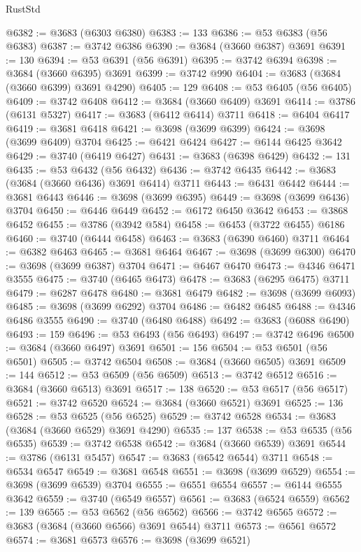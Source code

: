 \begin{lexlean}{RustStd}
\begin{coremodule}
@6382 := @3683 (@6303 @6380)
@6383 := 133
@6386 := @53 @6383 (@56 @6383)
@6387 := @3742 @6386
@6390 := @3684 (@3660 @6387) @3691
@6391 := 130
@6394 := @53 @6391 (@56 @6391)
@6395 := @3742 @6394
@6398 := @3684 (@3660 @6395) @3691
@6399 := @3742 @990
@6404 := @3683 (@3684 (@3660 @6399) @3691 @4290)
@6405 := 129
@6408 := @53 @6405 (@56 @6405)
@6409 := @3742 @6408
@6412 := @3684 (@3660 @6409) @3691
@6414 := @3786 (@6131 @5327)
@6417 := @3683 (@6412 @6414) @3711
@6418 := @6404 @6417
@6419 := @3681 @6418
@6421 := @3698 (@3699 @6399)
@6424 := @3698 (@3699 @6409) @3704
@6425 := @6421 @6424
@6427 := @6144 @6425 @3642
@6429 := @3740 (@6419 @6427)
@6431 := @3683 (@6398 @6429)
@6432 := 131
@6435 := @53 @6432 (@56 @6432)
@6436 := @3742 @6435
@6442 := @3683 (@3684 (@3660 @6436) @3691 @6414) @3711
@6443 := @6431 @6442
@6444 := @3681 @6443
@6446 := @3698 (@3699 @6395)
@6449 := @3698 (@3699 @6436) @3704
@6450 := @6446 @6449
@6452 := @6172 @6450 @3642
@6453 := @3868 @6452
@6455 := @3786 (@3942 @584)
@6458 := @6453 (@3722 @6455) @6186
@6460 := @3740 (@6444 @6458)
@6463 := @3683 (@6390 @6460) @3711
@6464 := @6382 @6463
@6465 := @3681 @6464
@6467 := @3698 (@3699 @6300)
@6470 := @3698 (@3699 @6387) @3704
@6471 := @6467 @6470
@6473 := @4346 @6471 @3555
@6475 := @3740 (@6465 @6473)
@6478 := @3683 (@6295 @6475) @3711
@6479 := @6287 @6478
@6480 := @3681 @6479
@6482 := @3698 (@3699 @6093)
@6485 := @3698 (@3699 @6292) @3704
@6486 := @6482 @6485
@6488 := @4346 @6486 @3555
@6490 := @3740 (@6480 @6488)
@6492 := @3683 (@6088 @6490)
@6493 := 159
@6496 := @53 @6493 (@56 @6493)
@6497 := @3742 @6496
@6500 := @3684 (@3660 @6497) @3691
@6501 := 156
@6504 := @53 @6501 (@56 @6501)
@6505 := @3742 @6504
@6508 := @3684 (@3660 @6505) @3691
@6509 := 144
@6512 := @53 @6509 (@56 @6509)
@6513 := @3742 @6512
@6516 := @3684 (@3660 @6513) @3691
@6517 := 138
@6520 := @53 @6517 (@56 @6517)
@6521 := @3742 @6520
@6524 := @3684 (@3660 @6521) @3691
@6525 := 136
@6528 := @53 @6525 (@56 @6525)
@6529 := @3742 @6528
@6534 := @3683 (@3684 (@3660 @6529) @3691 @4290)
@6535 := 137
@6538 := @53 @6535 (@56 @6535)
@6539 := @3742 @6538
@6542 := @3684 (@3660 @6539) @3691
@6544 := @3786 (@6131 @5457)
@6547 := @3683 (@6542 @6544) @3711
@6548 := @6534 @6547
@6549 := @3681 @6548
@6551 := @3698 (@3699 @6529)
@6554 := @3698 (@3699 @6539) @3704
@6555 := @6551 @6554
@6557 := @6144 @6555 @3642
@6559 := @3740 (@6549 @6557)
@6561 := @3683 (@6524 @6559)
@6562 := 139
@6565 := @53 @6562 (@56 @6562)
@6566 := @3742 @6565
@6572 := @3683 (@3684 (@3660 @6566) @3691 @6544) @3711
@6573 := @6561 @6572
@6574 := @3681 @6573
@6576 := @3698 (@3699 @6521)

\end{coremodule}
\end{lexlean}
